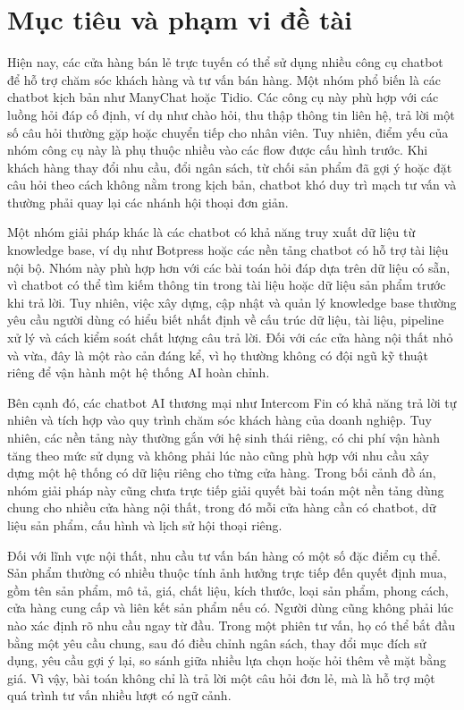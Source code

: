 \documentclass[../DoAn.tex]{subfiles}
\begin{document}
\section{Mục tiêu và phạm vi đề tài}
\label{section:1.2}
Hiện nay, các cửa hàng bán lẻ trực tuyến có thể sử dụng nhiều công cụ chatbot để hỗ trợ chăm sóc khách hàng và tư vấn bán hàng. Một nhóm phổ biến là các chatbot kịch bản như ManyChat hoặc Tidio. Các công cụ này phù hợp với các luồng hỏi đáp cố định, ví dụ như chào hỏi, thu thập thông tin liên hệ, trả lời một số câu hỏi thường gặp hoặc chuyển tiếp cho nhân viên. Tuy nhiên, điểm yếu của nhóm công cụ này là phụ thuộc nhiều vào các flow được cấu hình trước. Khi khách hàng thay đổi nhu cầu, đổi ngân sách, từ chối sản phẩm đã gợi ý hoặc đặt câu hỏi theo cách không nằm trong kịch bản, chatbot khó duy trì mạch tư vấn và thường phải quay lại các nhánh hội thoại đơn giản.

Một nhóm giải pháp khác là các chatbot có khả năng truy xuất dữ liệu từ knowledge base, ví dụ như Botpress hoặc các nền tảng chatbot có hỗ trợ tài liệu nội bộ. Nhóm này phù hợp hơn với các bài toán hỏi đáp dựa trên dữ liệu có sẵn, vì chatbot có thể tìm kiếm thông tin trong tài liệu hoặc dữ liệu sản phẩm trước khi trả lời. Tuy nhiên, việc xây dựng, cập nhật và quản lý knowledge base thường yêu cầu người dùng có hiểu biết nhất định về cấu trúc dữ liệu, tài liệu, pipeline xử lý và cách kiểm soát chất lượng câu trả lời. Đối với các cửa hàng nội thất nhỏ và vừa, đây là một rào cản đáng kể, vì họ thường không có đội ngũ kỹ thuật riêng để vận hành một hệ thống AI hoàn chỉnh.

Bên cạnh đó, các chatbot AI thương mại như Intercom Fin có khả năng trả lời tự nhiên và tích hợp vào quy trình chăm sóc khách hàng của doanh nghiệp. Tuy nhiên, các nền tảng này thường gắn với hệ sinh thái riêng, có chi phí vận hành tăng theo mức sử dụng và không phải lúc nào cũng phù hợp với nhu cầu xây dựng một hệ thống có dữ liệu riêng cho từng cửa hàng. Trong bối cảnh đồ án, nhóm giải pháp này cũng chưa trực tiếp giải quyết bài toán một nền tảng dùng chung cho nhiều cửa hàng nội thất, trong đó mỗi cửa hàng cần có chatbot, dữ liệu sản phẩm, cấu hình và lịch sử hội thoại riêng.

Đối với lĩnh vực nội thất, nhu cầu tư vấn bán hàng có một số đặc điểm cụ thể. Sản phẩm thường có nhiều thuộc tính ảnh hưởng trực tiếp đến quyết định mua, gồm tên sản phẩm, mô tả, giá, chất liệu, kích thước, loại sản phẩm, phong cách, cửa hàng cung cấp và liên kết sản phẩm nếu có. Người dùng cũng không phải lúc nào xác định rõ nhu cầu ngay từ đầu. Trong một phiên tư vấn, họ có thể bắt đầu bằng một yêu cầu chung, sau đó điều chỉnh ngân sách, thay đổi mục đích sử dụng, yêu cầu gợi ý lại, so sánh giữa nhiều lựa chọn hoặc hỏi thêm về mặt bằng giá. Vì vậy, bài toán không chỉ là trả lời một câu hỏi đơn lẻ, mà là hỗ trợ một quá trình tư vấn nhiều lượt có ngữ cảnh.
\end{document}
